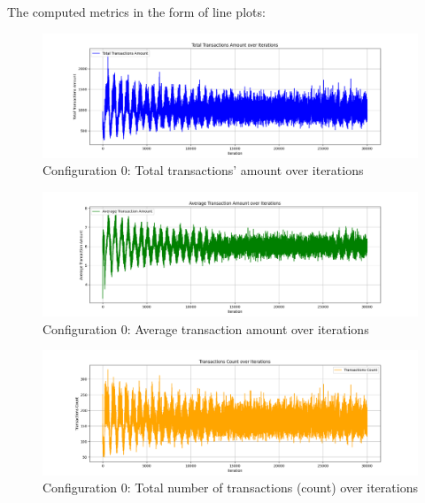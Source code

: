 \documentclass[english]{projectreport}
\begin{document}
    The computed metrics in the form of line plots:

    \begin{figure}[H]
        \centering
        \includegraphics[width=0.8\linewidth]{metrics_config0/metrics_config0_total_transactions_amount.png}
        \caption{Configuration 0: Total transactions' amount over iterations}
        \label{fig:c0-total_transactions_amount}
    \end{figure}

    \begin{figure}[H]
        \centering
        \includegraphics[width=0.8\linewidth]{metrics_config0/metrics_config0_average_transaction_amount.png}
        \caption{Configuration 0: Average transaction amount over iterations}
        \label{fig:c0-average_transaction_amount}
    \end{figure}

    \begin{figure}[H]
        \centering
        \includegraphics[width=0.8\linewidth]{metrics_config0/metrics_config0_total_transactions_count.png}
        \caption{Configuration 0: Total number of transactions (count) over iterations}
        \label{fig:c0-total_transactions_count}
    \end{figure}
\end{document}

